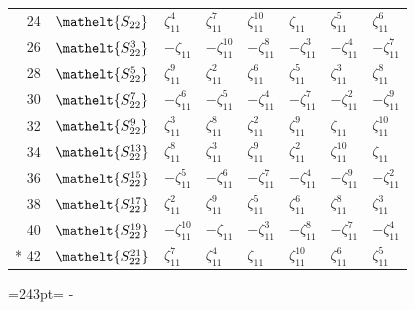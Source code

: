 \documentclass[10pt,a4paper]{article}
\newcommand{\needspace}[1]{\par\penalty-100\begingroup\dimen0=#1\relax\dimen2=\pagegoal
  \advance\dimen2-\pagetotal\ifdim\dimen0>\dimen2\relax\ifdim\dimen2>0pt\vfil\break\fi\fi
  \endgroup}
\numberwithin{equation}{section}
\newcommand{\eltfont}[1]{{\let\sigma\eltsigma\mathelt{#1}}}
\newcommand{\cls}[1]{\eltfont{#1}}
\newcommand{\rootunity}[1]{\zeta_{#1}}
\begin{document}
{\begin{longtable}{@{}rlllllll@{}}
24 & $\cls{S_{22}}$ & $\rootunity{11}^{4}$ & $\rootunity{11}^{7}$ & $\rootunity{11}^{10}$ & $\rootunity{11}$ & $\rootunity{11}^{5}$ & $\rootunity{11}^{6}$\\
26 & $\cls{S_{22}^{3}}$ & $-\rootunity{11}$ & $-\rootunity{11}^{10}$ & $-\rootunity{11}^{8}$ & $-\rootunity{11}^{3}$ & $-\rootunity{11}^{4}$ & $-\rootunity{11}^{7}$\\
28 & $\cls{S_{22}^{5}}$ & $\rootunity{11}^{9}$ & $\rootunity{11}^{2}$ & $\rootunity{11}^{6}$ & $\rootunity{11}^{5}$ & $\rootunity{11}^{3}$ & $\rootunity{11}^{8}$\\
30 & $\cls{S_{22}^{7}}$ & $-\rootunity{11}^{6}$ & $-\rootunity{11}^{5}$ & $-\rootunity{11}^{4}$ & $-\rootunity{11}^{7}$ & $-\rootunity{11}^{2}$ & $-\rootunity{11}^{9}$\\
32 & $\cls{S_{22}^{9}}$ & $\rootunity{11}^{3}$ & $\rootunity{11}^{8}$ & $\rootunity{11}^{2}$ & $\rootunity{11}^{9}$ & $\rootunity{11}$ & $\rootunity{11}^{10}$\\
34 & $\cls{S_{22}^{13}}$ & $\rootunity{11}^{8}$ & $\rootunity{11}^{3}$ & $\rootunity{11}^{9}$ & $\rootunity{11}^{2}$ & $\rootunity{11}^{10}$ & $\rootunity{11}$\\
36 & $\cls{S_{22}^{15}}$ & $-\rootunity{11}^{5}$ & $-\rootunity{11}^{6}$ & $-\rootunity{11}^{7}$ & $-\rootunity{11}^{4}$ & $-\rootunity{11}^{9}$ & $-\rootunity{11}^{2}$\\
38 & $\cls{S_{22}^{17}}$ & $\rootunity{11}^{2}$ & $\rootunity{11}^{9}$ & $\rootunity{11}^{5}$ & $\rootunity{11}^{6}$ & $\rootunity{11}^{8}$ & $\rootunity{11}^{3}$\\
40 & $\cls{S_{22}^{19}}$ & $-\rootunity{11}^{10}$ & $-\rootunity{11}$ & $-\rootunity{11}^{3}$ & $-\rootunity{11}^{8}$ & $-\rootunity{11}^{7}$ & $-\rootunity{11}^{4}$\\*
42 & $\cls{S_{22}^{21}}$ & $\rootunity{11}^{7}$ & $\rootunity{11}^{4}$ & $\rootunity{11}$ & $\rootunity{11}^{10}$ & $\rootunity{11}^{6}$ & $\rootunity{11}^{5}$\\
\bottomrule\end{longtable}}
\needspace{243pt}
\end{document}
